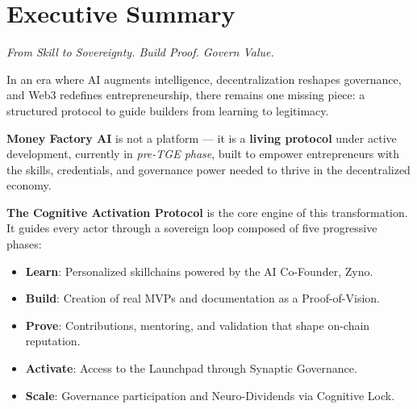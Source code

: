 
\section{Executive Summary}

\begin{center}
\textit{From Skill to Sovereignty. Build Proof. Govern Value.}
\end{center}

\vspace{0.8em}

In an era where AI augments intelligence, decentralization reshapes governance, and Web3 redefines entrepreneurship, there remains one missing piece: a structured protocol to guide builders from learning to legitimacy.

\textbf{Money Factory AI} is not a platform — it is a \textbf{living protocol} under active development, currently in \textit{pre-TGE phase}, built to empower entrepreneurs with the skills, credentials, and governance power needed to thrive in the decentralized economy.

\vspace{0.5em}

\textbf{The Cognitive Activation Protocol{\texttrademark}} is the core engine of this transformation. It guides every actor through a sovereign loop composed of five progressive phases:

\begin{itemize}
  \item \textbf{Learn}: Personalized skillchains powered by the AI Co-Founder{\texttrademark}, Zyno{\texttrademark}.
  \item \textbf{Build}: Creation of real MVPs and documentation as a Proof-of-Vision{\texttrademark}.
  \item \textbf{Prove}: Contributions, mentoring, and validation that shape on-chain reputation.
  \item \textbf{Activate}: Access to the Launchpad through Synaptic Governance{\texttrademark}.
  \item \textbf{Scale}: Governance participation and Neuro-Dividends{\texttrademark} via Cognitive Lock{\texttrademark}.
\end{itemize}

\vspace{0.5em}

